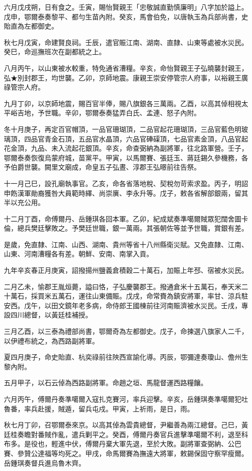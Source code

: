 \begin{pinyinscope}
六月戊戌朔，日有食之。壬寅，賜怡賢親王「忠敬誠直勤慎廉明」八字加於謚上。戊申，鄂爾泰奏黎平、都勻生苗內附。癸亥，馬會伯免，以唐執玉為兵部尚書，史貽直為左都御史。

秋七月戊寅，命建賢良祠。壬辰，遣官賑江南、湖南、直隸、山東等處被水災民。癸巳，命巡撫班次在副都統之上。

八月丙午，以山東被水較重，特免通省漕糧。辛亥，命怡賢親王子弘曉襲封親王，弘★別封郡王，均世襲。乙卯，京師地震。康親王崇安停管宗人府事，以裕親王廣祿管宗人府。

九月丁卯，以京師地震，賜百官半俸，賜八旗銀各三萬兩。乙酉，以高其倬相視太平峪吉地，予世職。辛卯，鄂爾泰奏猛弄白氏、孟連、怒子內附。

冬十月庚子，再定百官帽頂，一品官珊瑚頂，二品官起花珊瑚頂，三品官藍色明玻璃頂，四品官青金石頂，五品官水晶頂，六品官硨磲頂，七品官素金頂，八品官起花金頂，九品、未入流起花銀頂。辛亥，命查弼納為副將軍，往北路軍營。壬子，鄂爾泰奏恢復烏蒙府城，苗黨平。甲寅，以馬爾賽、張廷玉、蔣廷錫久參機務，各予伯爵世襲。闕里文廟成，命皇五子弘晝、淳郡王弘暻前往告祭。

十一月己巳，設孔廟執事官。乙亥，命各省落地稅、契稅勿苛索求盈。丙子，明詔申飭漢軍勛裔獲咎大員範時繹、尚崇廙、李永升等。戊子，敕各省解部銀兩，留其半以充公用。

十二月丁酉，命傅爾丹、岳鍾琪各回本軍。乙卯，紀成斌奏準噶爾賊眾犯闊舍圖卡倫，總兵樊廷擊敗之。予樊廷世職，銀一萬兩。其張朝佐等並予世職，賞銀有差。

是歲，免直隸、江南、山西、湖南、貴州等省十八州縣衛災賦。又免直隸、江南、山東、河南漕糧各有差。朝鮮、安南、南掌入貢。

九年辛亥春正月庚寅，詔撥揚州鹽義倉積穀二十萬石，加賑上年邳、宿被水災民。

二月乙未，愉郡王胤烜薨，謚曰恪，子弘慶襲郡王。撥通倉米十五萬石，奉天米二十萬石，採買米五萬石，運往山東備賑。戊戌，命常賚為鎮安將軍，率甘、涼兵駐安西。戊午，以田文鏡年老多病，命侍郎王國棟前往河南賑濟被水災民。壬戌，專設四川總督，以黃廷桂補授。

三月乙酉，以三泰為禮部尚書，鄂爾奇為左都御史。戊子，命揀選八旗家人二千，以伊禮布統之，為西路副將軍。

夏四月庚子，命史貽直、杭奕祿前往陜西宣諭化導。丙辰，鄂彌達奏瓊山、儋州生黎內附。

五月甲子，以石云倬為西路副將軍。命趙之垣、馬龍督運西路糧饟。

六月丙午，傅爾丹奏準噶爾入寇扎克賽河，率兵迎擊。辛亥，岳鍾琪奏準噶爾犯吐魯番，率兵赴援，賊遁，留兵屯戍。甲寅，上祈雨，是日，雨。

秋七月丁卯，召鄂爾泰來京。以高其倬為雲貴總督，尹繼善為兩江總督。己巳，黃廷桂奏瞻對番賊作亂，遣兵剿平之。癸酉，傅爾丹奏官兵進擊準噶爾不利，退至科布多。是役也，輕進中伏，傅爾丹棄大軍先退，至於大敗。副將軍查弼納、公巴賽、參贊公達福等均死之。甲戌，命馬爾賽為撫遠大將軍，敕錫保固守察罕瘦爾。岳鍾琪奏督兵進烏魯木齊。


\end{pinyinscope}
